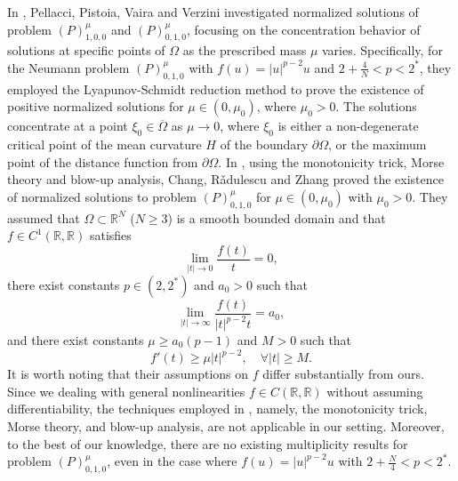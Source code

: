 \documentclass[11pt]{amsart}
\newcommand{\abs}[1]{\lvert#1\rvert}
\newcommand{\R}{\mathbb{R}}
\numberwithin{equation}{section}
\begin{document}
In \cite{Pellacci}, Pellacci, Pistoia, Vaira and Verzini investigated normalized solutions of problem $(P)^{\mu}_{1,0,0}$ and $(P)^{\mu}_{0,1,0}$, focusing on the concentration behavior of solutions at specific points of $\Omega$ as the prescribed mass $\mu$ varies. Specifically, for the Neumann problem $(P)^{\mu}_{0,1,0}$ with $f(u) = \vert u\vert^{p-2}u$ and $2+\frac{4}{N}<p<2^*$, they employed the Lyapunov-Schmidt reduction method to prove the existence of positive normalized solutions for $\mu \in (0, \mu_0)$, where $\mu_0 > 0$. The solutions concentrate at a point $\xi_0 \in \overline{\Omega}$ as $\mu \to 0$, where $\xi_0$ is either a non-degenerate critical point of the mean curvature $H$ of the boundary $\partial \Omega$, or the maximum point of the distance function from $\partial \Omega$. In \cite{Chang}, using the monotonicity trick, Morse theory and blow-up analysis, Chang, R\v{a}dulescu and Zhang proved the existence of normalized solutions to problem $(P)^{\mu}_{0,1,0}$  for $\mu \in (0, \mu_0)$ with $\mu_0 > 0$. They assumed that $\Omega \subset \R^N$ ($N \geq 3$) is a smooth bounded domain and that $f\in C^1(\R,\R)$ satisfies
$$
\displaystyle \lim_{|t| \to 0} \frac{f(t)}{t} = 0,
$$
there exist constants $p \in (2,2^*)$ and  $a_0 > 0$ such that
$$
          \lim_{|t| \to \infty} \frac{f(t)}{|t|^{p-2}t} = a_0,
$$
and there exist constants $\mu \geq a_0(p-1)$ and $M > 0$ such that
$$
f'(t)\geq \mu |t|^{p-2}, \quad \forall |t| \geq M.
$$
It is worth noting that their assumptions on $f$ differ substantially from ours. Since we dealing with general nonlinearities $f \in C(\R,\R)$ without assuming differentiability, the techniques employed in  \cite{Chang}, namely, the monotonicity trick, Morse theory, and blow-up analysis, are not applicable in our setting. Moreover,  to the best of our knowledge, there are no existing multiplicity results for problem $(P)^{\mu}_{0,1,0}$, even in the case where  $f(u)=\abs{u}^{p-2}u$ with $2+\frac{N}{4}<p<2^*$.
\end{document}

